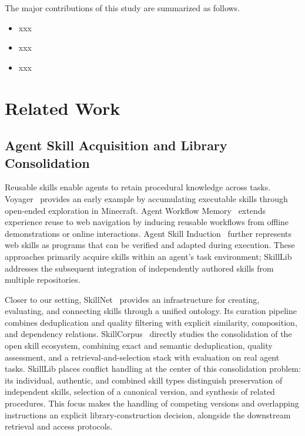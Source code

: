 \documentclass{article}
\theoremstyle{plain}
\theoremstyle{definition}
\theoremstyle{remark}
\begin{document}
The major contributions of this study are summarized as follows. 
\begin{itemize}
  \item xxx
  \item xxx
  \item xxx
\end{itemize}


\section{Related Work}\label{sec:relatedWork}

\subsection{Agent Skill Acquisition and Library Consolidation}
Reusable skills enable agents to retain procedural knowledge across tasks.
Voyager~\cite{wang2023voyager} provides an early example by accumulating executable skills through open-ended exploration in Minecraft.
Agent Workflow Memory~\cite{wang2025awm} extends experience reuse to web navigation by inducing reusable workflows from offline demonstrations or online interactions.
Agent Skill Induction~\cite{wang2025asi} further represents web skills as programs that can be verified and adapted during execution.
These approaches primarily acquire skills within an agent's task environment; SkillLib addresses the subsequent integration of independently authored skills from multiple repositories.

Closer to our setting, SkillNet~\cite{liang2026skillnet} provides an infrastructure for creating, evaluating, and connecting skills through a unified ontology.
Its curation pipeline combines deduplication and quality filtering with explicit similarity, composition, and dependency relations.
SkillCorpus~\cite{wang2026skillcorpus} directly studies the consolidation of the open skill ecosystem, combining exact and semantic deduplication, quality assessment, and a retrieval-and-selection stack with evaluation on real agent tasks.
SkillLib places conflict handling at the center of this consolidation problem: its individual, authentic, and combined skill types distinguish preservation of independent skills, selection of a canonical version, and synthesis of related procedures.
This focus makes the handling of competing versions and overlapping instructions an explicit library-construction decision, alongside the downstream retrieval and access protocols.
\end{document}
